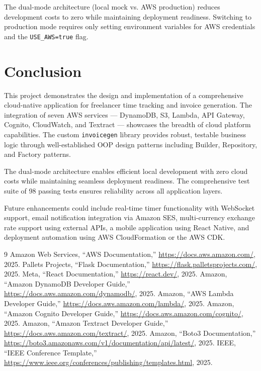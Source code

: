 \documentclass[conference]{IEEEtran}
\begin{document}
The dual-mode architecture (local mock vs. AWS production) reduces development costs to zero while maintaining deployment readiness. Switching to production mode requires only setting environment variables for AWS credentials and the \texttt{USE\_AWS=true} flag.

\section{Conclusion}

This project demonstrates the design and implementation of a comprehensive cloud-native application for freelancer time tracking and invoice generation. The integration of seven AWS services --- DynamoDB, S3, Lambda, API Gateway, Cognito, CloudWatch, and Textract --- showcases the breadth of cloud platform capabilities. The custom \texttt{invoicegen} library provides robust, testable business logic through well-established OOP design patterns including Builder, Repository, and Factory patterns.

The dual-mode architecture enables efficient local development with zero cloud costs while maintaining seamless deployment readiness. The comprehensive test suite of 98 passing tests ensures reliability across all application layers.

Future enhancements could include real-time timer functionality with WebSocket support, email notification integration via Amazon SES, multi-currency exchange rate support using external APIs, a mobile application using React Native, and deployment automation using AWS CloudFormation or the AWS CDK.

\begin{thebibliography}{9}
 Amazon Web Services, ``AWS Documentation,'' \url{https://docs.aws.amazon.com/}, 2025.
 Pallets Projects, ``Flask Documentation,'' \url{https://flask.palletsprojects.com/}, 2025.
 Meta, ``React Documentation,'' \url{https://react.dev/}, 2025.
 Amazon, ``Amazon DynamoDB Developer Guide,'' \url{https://docs.aws.amazon.com/dynamodb/}, 2025.
 Amazon, ``AWS Lambda Developer Guide,'' \url{https://docs.aws.amazon.com/lambda/}, 2025.
 Amazon, ``Amazon Cognito Developer Guide,'' \url{https://docs.aws.amazon.com/cognito/}, 2025.
 Amazon, ``Amazon Textract Developer Guide,'' \url{https://docs.aws.amazon.com/textract/}, 2025.
 Amazon, ``Boto3 Documentation,'' \url{https://boto3.amazonaws.com/v1/documentation/api/latest/}, 2025.
 IEEE, ``IEEE Conference Template,'' \url{https://www.ieee.org/conferences/publishing/templates.html}, 2025.
\end{thebibliography}
\end{document}
